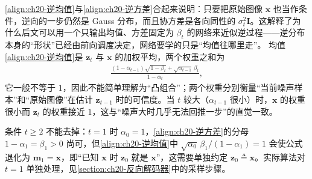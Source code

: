 \documentclass[../../main.tex]{subfiles}
\begin{document}
\begin{remark}
\eqref{align:ch20-逆均值}与\eqref{align:ch20-逆方差}合起来说明：只要把原始图像 $\bm{x}$ 也当作条件，逆向的一步仍然是 Gauss 分布，而且协方差是各向同性的 $\sigma_t^2\bm{I}$。这解释了为什么后文可以用一个只输出均值、方差固定为 $\beta_t$ 的网络来近似逆过程——逆分布本身的“形状”已经由前向调度决定，网络要学的只是“均值往哪里走”。
均值\eqref{align:ch20-逆均值}是 $\bm{z}_t$ 与 $\bm{x}$ 的加权平均，两个权重之和为
\begin{align*}
\frac{(1-\alpha_{t-1})\sqrt{1-\beta_t}+\sqrt{\alpha_{t-1}}\,\beta_t}{1-\alpha_t},
\end{align*}
它一般不等于 $1$，因此不能简单理解为“凸组合”；两个权重分别衡量“当前噪声样本”和“原始图像”在估计 $\bm{z}_{t-1}$ 时的可信度。当 $t$ 较大（$\alpha_{t-1}$ 很小）时，$\bm{x}$ 的权重很小而 $\bm{z}_t$ 的权重接近 $1$，这与“噪声大时几乎无法回推一步”的直觉一致。\par
条件 $t\geqslant2$ 不能去掉：$t=1$ 时 $\alpha_0=1$，\eqref{align:ch20-逆方差}的分母 $1-\alpha_1=\beta_1>0$ 尚可，但\eqref{align:ch20-逆均值}中 $\sqrt{\alpha_0}\,\beta_1/(1-\alpha_1)=1$ 会使公式退化为 $\bm{m}_1=\bm{x}$，即“已知 $\bm{x}$ 时 $\bm{z}_0$ 就是 $\bm{x}$”，这需要单独约定 $\bm{z}_0\triangleq\bm{x}$。实际算法对 $t=1$ 单独处理，见\cref{section:ch20-反向解码器}中的采样步骤。
\end{remark}
\end{document}
